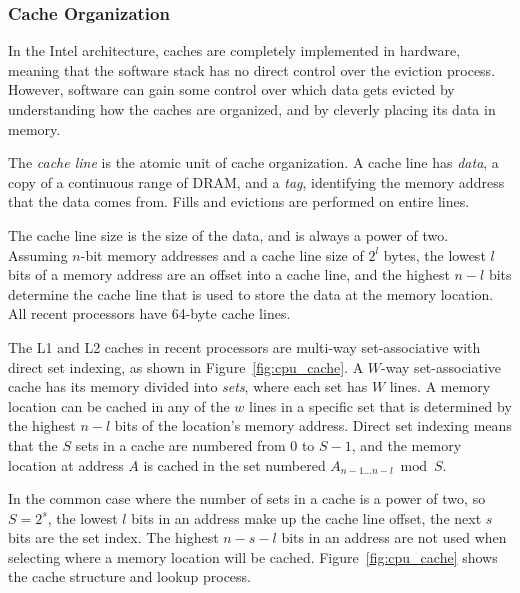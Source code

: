 \subsubsection{Cache Organization}
\label{sec:cache_org}

In the Intel architecture, caches are completely implemented in hardware,
meaning that the software stack has no direct control over the eviction
process. However, software can gain some control over which data gets evicted
by understanding how the caches are organized, and by cleverly placing its data
in memory.

The \textit{cache line} is the atomic unit of cache organization. A cache line
has \textit{data}, a copy of a continuous range of DRAM, and a \textit{tag},
identifying the memory address that the data comes from. Fills and evictions
are performed on entire lines.

The cache line size is the size of the data, and is always a power of two.
Assuming $n$-bit memory addresses and a cache line size of $2^{l}$ bytes, the
lowest $l$ bits of a memory address are an offset into a cache line, and the
highest $n - l$ bits determine the cache line that is used to store the data at
the memory location. All recent processors have 64-byte cache lines.

The L1 and L2 caches in recent processors are multi-way set-associative with
direct set indexing, as shown in Figure~\ref{fig:cpu_cache}. A $W$-way
set-associative cache has its memory divided into \textit{sets}, where each set
has $W$ lines. A memory location can be cached in any of the $w$ lines in a
specific set that is determined by the highest $n - l$ bits of the location's
memory address. Direct set indexing means that the $S$ sets in a cache are
numbered from $0$ to $S - 1$, and the memory location at address $A$ is cached
in the set numbered $A_{n - 1 \ldots n - l} \bmod S$.

In the common case where the number of sets in a cache is a power of two, so $S
= 2^{s}$, the lowest $l$ bits in an address make up the cache line offset, the
next $s$ bits are the set index. The highest $n - s - l$ bits in an address are
not used when selecting where a memory location will be cached.
Figure~\ref{fig:cpu_cache} shows the cache structure and lookup process.

